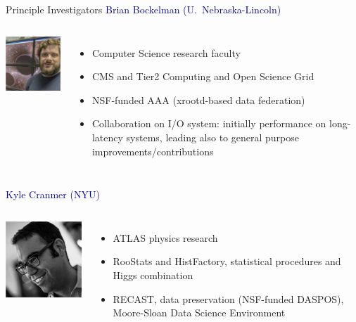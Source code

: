\documentclass{beamer}
\begin{document}
\begin{frame}{Principle Investigators}
\hspace{-0.6 cm}\textcolor{darkblue}{\large Brian Bockelman (U.\ Nebraska-Lincoln)}

\begin{columns}
\includegraphics[height=2 cm]{brian_bockelman.png}

\begin{itemize}
\item Computer Science research faculty
\item CMS and Tier2 Computing and Open Science Grid
\item NSF-funded AAA (xrootd-based data federation)
\item Collaboration on I/O system: initially performance on long-latency systems, leading also to general purpose improvements/contributions
\end{itemize}
\end{columns}

\vspace{0.25 cm}
\hspace{-0.6 cm}\textcolor{darkblue}{\large Kyle Cranmer (NYU)}

\begin{columns}
\includegraphics[height=2 cm]{kyle_cranmer.png}

\begin{itemize}
\item ATLAS physics research
\item RooStats and HistFactory, statistical procedures and Higgs combination
\item RECAST, data preservation (NSF-funded DASPOS), Moore-Sloan Data Science Environment
\end{itemize}
\end{columns}
\end{frame}
\end{document}
